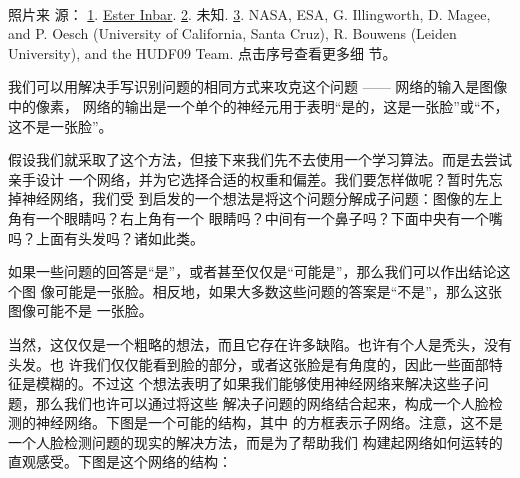\begin{center}
\begin{minipage}{0.4\textwidth}
\end{minipage}
\\
\begin{minipage}{0.9\textwidth}
  \footnotesize 照片来
  源：
  \href{http://commons.wikimedia.org/wiki/File:Kangaroo_ST_03.JPG}{1}. \href{http://commons.wikimedia.org/wiki/User:ST}{Ester
    Inbar}. \href{http://commons.wikimedia.org/wiki/File:Albert_Einstein_at_the_age_of_three_(1882).jpg}{2}. 未知. \href{http://commons.wikimedia.org/wiki/File:The_Hubble_eXtreme_Deep_Field.jpg}{3}. NASA,
  ESA, G. Illingworth, D. Magee, and P. Oesch (University of California, Santa
  Cruz), R. Bouwens (Leiden University), and the HUDF09 Team. 点击序号查看更多细
  节。
\end{minipage}
\end{center}

我们可以用解决手写识别问题的相同方式来攻克这个问题 —— 网络的输入是图像中的像素，
网络的输出是一个单个的神经元用于表明``是的，这是一张脸''或``不，这不是一张脸''。

假设我们就采取了这个方法，但接下来我们先不去使用一个学习算法。而是去尝试亲手设计
一个网络，并为它选择合适的权重和偏差。我们要怎样做呢？暂时先忘掉神经网络，我们受
到启发的一个想法是将这个问题分解成子问题：图像的左上角有一个眼睛吗？右上角有一个
眼睛吗？中间有一个鼻子吗？下面中央有一个嘴吗？上面有头发吗？诸如此类。

如果一些问题的回答是``是''，或者甚至仅仅是``可能是''，那么我们可以作出结论这个图
像可能是一张脸。相反地，如果大多数这些问题的答案是``不是''，那么这张图像可能不是
一张脸。

当然，这仅仅是一个粗略的想法，而且它存在许多缺陷。也许有个人是秃头，没有头发。也
许我们仅仅能看到脸的部分，或者这张脸是有角度的，因此一些面部特征是模糊的。不过这
个想法表明了如果我们能够使用神经网络来解决这些子问题，那么我们也许可以通过将这些
解决子问题的网络结合起来，构成一个人脸检测的神经网络。下图是一个可能的结构，其中
的方框表示子网络。注意，这不是一个人脸检测问题的现实的解决方法，而是为了帮助我们
构建起网络如何运转的直观感受。下图是这个网络的结构：

